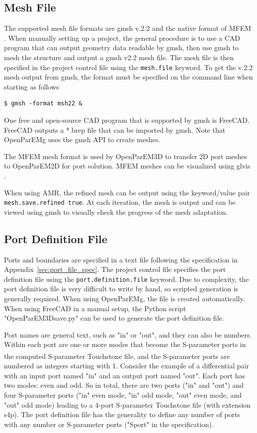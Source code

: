 \documentclass[titlepage]{article}
\renewcommand\_{\textunderscore\linebreak[1]}
\begin{document}
\subsection{Mesh File}

The supported mesh file formats are gmsh v.2.2 and the native format of MFEM \cite{MFEM}\cite{MFEMweb}.  When manually setting up a project, the general procedure is to use a CAD program that can output geometry data readable by gmsh, then use gmsh to mesh the structure and output a gmsh v2.2 mesh file.  The mesh file is then specified in the project control file using the \texttt{mesh.file} keyword.  To get the v.2.2 mesh output from gmsh, the format must be specified on the command line when starting as follows
\begin{Verbatim}[fontsize=\small]
   $ gmsh -format msh22 &
\end{Verbatim}
\noindent One free and open-source CAD program that is supported by gmsh is FreeCAD.  FreeCAD outputs a *.brep file that can be imported by gmsh.  Note that OpenParEMg uses the gmsh API to create meshes.

The MFEM mesh format is used by OpenParEM3D to transfer 2D port meshes to OpenParEM2D for port solution. MFEM meshes can be visualized using glvis \cite{glvis}. 

When using AMR, the refined mesh can be output using the keyword/value pair \texttt{mesh.save.refined true}.  At each iteration, the mesh is output and can be viewed using gmsh to visually check the progress of the mesh adaptation.

\subsection{Port Definition File}
\label{sec:port_definition_file}

Ports and boundaries are specified in a text file following the specification in Appendix~\ref{sec:port_file_spec}.  The project control file specifies the port definition file using the \texttt{port.definition.file} keyword. Due to complexity, the port definition file is very difficult to write by hand, so scripted generation is generally required.  When using OpenParEMg, the file is created automatically.  When using FreeCAD in a manual setup, the Python script "OpenParEM3D\_save.py" can be used to generate the port definition file.

Port names are general text, such as "in" or "out", and they can also be numbers. Within each port are one or more modes that become the S-parameter ports in the computed S-parameter Touchstone\textsuperscript{\textregistered} \cite{IBIS} file, and the S-parameter ports are numbered as integers starting with 1. Consider the example of a differential pair with an input port named "in" and an output port named "out". Each port has two modes: even and odd.  So in total, there are two ports ("in" and "out") and four S-parameter ports ("in" even mode, "in" odd mode, "out" even mode, and "out" odd mode) leading to a 4-port S-parameter Touchstone file (with extension s4p). The port definition file has the generality to define any number of ports with any number or S-parameter ports ("Sport" in the specification).
\end{document}
